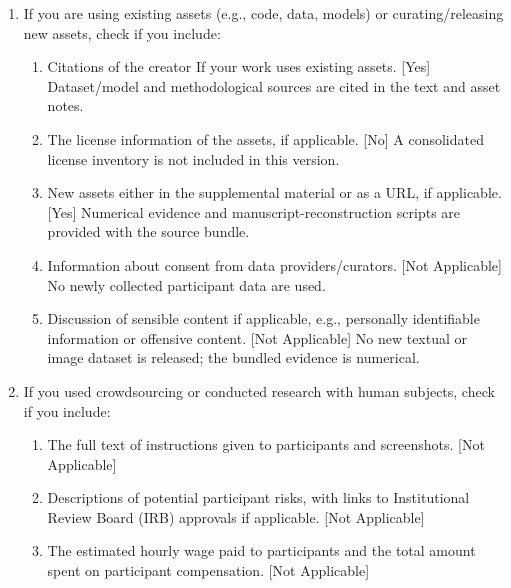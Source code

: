 {\begin{enumerate}
\begin{enumerate}
\item A clear definition of the specific measure or statistics and error bars (e.g., with respect to the random seed after running experiments multiple times). [Yes] Captions and  specify statistics, replication units, and the VAE bootstrap.
\item A description of the computing infrastructure used. (e.g., type of GPUs, internal cluster, or cloud provider). [No]  lists the known processor and thread settings. Some runs lack hardware metadata.
\end{enumerate}
\item If you are using existing assets (e.g., code, data, models) or curating/releasing new assets, check if you include:
\begin{enumerate}
\item Citations of the creator If your work uses existing assets. [Yes] Dataset/model and methodological sources are cited in the text and asset notes.
\item The license information of the assets, if applicable. [No] A consolidated license inventory is not included in this version.
\item New assets either in the supplemental material or as a URL, if applicable. [Yes] Numerical evidence and manuscript-reconstruction scripts are provided with the source bundle.
\item Information about consent from data providers/curators. [Not Applicable] No newly collected participant data are used.
\item Discussion of sensible content if applicable, e.g., personally identifiable information or offensive content. [Not Applicable] No new textual or image dataset is released; the bundled evidence is numerical.
\end{enumerate}
\item If you used crowdsourcing or conducted research with human subjects, check if you include:
\begin{enumerate}
\item The full text of instructions given to participants and screenshots. [Not Applicable]
\item Descriptions of potential participant risks, with links to Institutional Review Board (IRB) approvals if applicable. [Not Applicable]
\item The estimated hourly wage paid to participants and the total amount spent on participant compensation. [Not Applicable]
\end{enumerate}
\end{enumerate}
}


